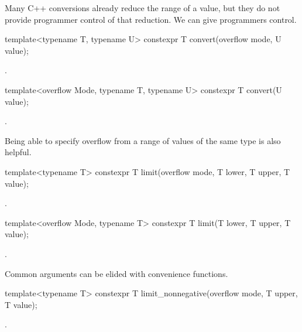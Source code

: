 \begin{addedblock}
Many C++ conversions already reduce the range of a value, but they do not provide programmer control of that reduction. We can give programmers control.

\begin{itemdecl}
template<typename T, typename U>
constexpr T convert(overflow mode, U value);
\end{itemdecl}

\begin{itemdescr}
\returns {}.
\end{itemdescr}

\begin{itemdecl}
template<overflow Mode, typename T, typename U>
constexpr T convert(U value);
\end{itemdecl}

\begin{itemdescr}
\returns {}.
\end{itemdescr}

Being able to specify overflow from a range of values of the same type is also helpful.

\begin{itemdecl}
template<typename T>
constexpr T limit(overflow mode, T lower, T upper, T value);
\end{itemdecl}

\begin{itemdescr}
\returns {}.
\end{itemdescr}

\begin{itemdecl}
template<overflow Mode, typename T>
constexpr T limit(T lower, T upper, T value);
\end{itemdecl}

\begin{itemdescr}
\returns {}.
\end{itemdescr}

Common arguments can be elided with convenience functions.

\begin{itemdecl}
template<typename T>
constexpr T limit_nonnegative(overflow mode, T upper, T value);
\end{itemdecl}

\begin{itemdescr}
\returns {}.
\end{itemdescr}


\end{addedblock}
